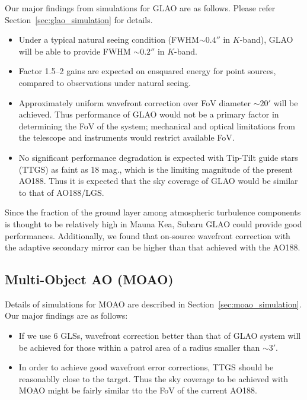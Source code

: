 Our major findings from simulations for GLAO are as follows. 
Please refer Section~\ref{sec:glao_simulation} for details.

\begin{itemize}
 \setlength{\itemsep}{-3pt}
 \item Under a typical natural seeing condition (FWHM$\sim 0.4''$ in
       $K$-band), GLAO will be able to provide FWHM $\sim 0.2''$ in
       $K$-band. 
 \item Factor 1.5--2 gains are expected on ensquared energy for point
       sources, compared to observations under natural seeing.
 \item Approximately uniform wavefront correction over FoV diameter
       $\sim 20'$ will be achieved. Thus performance of GLAO would not
       be a primary factor in determining the FoV of the system;
       mechanical and optical limitations from the telescope and
       instruments would restrict available FoV.
 \item No significant performance degradation is expected with Tip-Tilt
       guide stars (TTGS) as faint as 18 mag., which is the limiting magnitude
       of the present AO188. Thus it is expected that the sky coverage
       of GLAO would be similar to that of AO188/LGS.
\end{itemize}

Since the fraction of the ground layer among atmospheric turbulence
components is thought to be relatively high in Mauna Kea, Subaru GLAO
could provide good performances. Additionally, we found that on-source
wavefront correction with the adaptive secondary mirror can be higher
than that achieved with the AO188.


\subsection{Multi-Object AO (MOAO)}

Details of simulations for MOAO are described in
Section~\ref{sec:moao_simulation}. Our major findings are as follows:

\begin{itemize}
 \setlength{\itemsep}{-3pt}
 \item If we use 6 GLSs, wavefront correction better than that of GLAO
       system will be achieved for those within a patrol area of a
       radius smaller than $\sim 3'$.

 \item In order to achieve good wavefront error corrections, TTGS should
       be reasonablly close to the target. Thus the sky coverage to be
       achieved with MOAO might be fairly similar tto the FoV of the
       current AO188.
\end{itemize}

